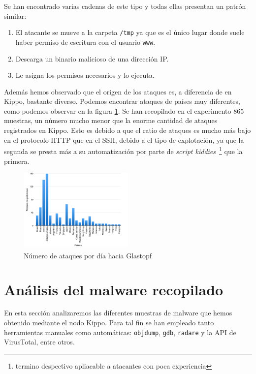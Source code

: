\documentclass[journal]{IEEEtran}
\begin{document}
Se han encontrado varias cadenas de este tipo y todas ellas presentan un patrón similar:
\begin{enumerate}
\item El atacante se mueve a la carpeta {\tt /tmp} ya que es el único lugar donde suele haber permiso de escritura con el usuario {\tt www}.
\item Descarga un binario malicioso de una dirección IP.
\item Le asigna los permisos necesarios y lo ejecuta.
\end{enumerate}

Además hemos observado que el origen de los ataques es, a diferencia de en Kippo, bastante diverso. Podemos encontrar ataques de países muy diferentes, como podemos observar en la figura \ref{fig:glastopf}. Se han recopilado en el experimento 865 muestras, un número mucho menor que la enorme cantidad de ataques registrados en Kippo. Esto es debido a que el ratio de ataques es mucho más bajo en el protocolo HTTP que en el SSH, debido a el tipo de explotación, ya que la segunda se presta más a su automatización por parte de {\it script kiddies}~\footnote{termino despectivo apliacable a atacantes con poca experiencia} que la primera.

\begin{figure}
\centering
\includegraphics[width=0.5\textwidth]{img/glastopf}
\caption{Número de ataques por día hacia Glastopf}
\label{fig:glastopf}
\end{figure}


\section{Análisis del malware recopilado}

En esta sección analizaremos las diferentes muestras de malware que hemos obtenido mediante el nodo Kippo. Para tal fin se han empleado tanto herramientas manuales como automáticas: {\tt objdump}, {\tt gdb}, {\tt radare} y la API de VirusTotal, entre otros.
\end{document}
